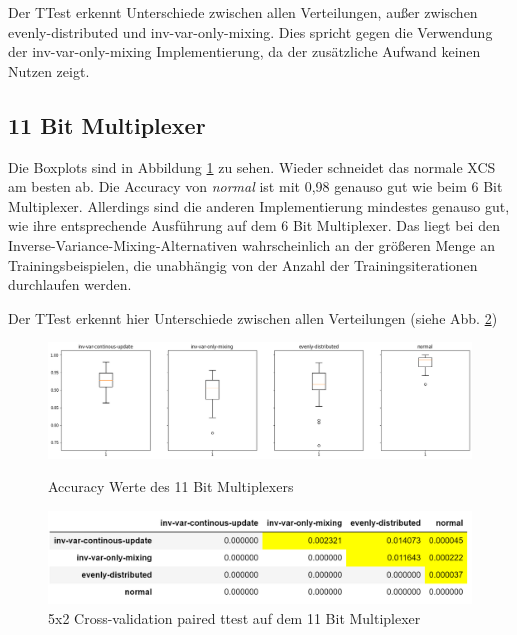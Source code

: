 \documentclass[10pt]{ocsmnar}
\begin{document}
Der TTest erkennt Unterschiede zwischen allen Verteilungen, außer zwischen evenly-distributed und inv-var-only-mixing. Dies spricht gegen die Verwendung der inv-var-only-mixing Implementierung, da der zusätzliche Aufwand keinen Nutzen zeigt.

\subsection{11 Bit Multiplexer}

Die Boxplots sind in Abbildung \ref{boxplot-11-bit} zu sehen. Wieder schneidet das normale XCS am besten ab. Die Accuracy von \textit{normal} ist mit 0,98 genauso gut wie beim 6 Bit Multiplexer. Allerdings sind die anderen Implementierung mindestes genauso gut, wie ihre entsprechende Ausführung auf dem 6 Bit Multiplexer.  Das liegt bei den Inverse-Variance-Mixing-Alternativen wahrscheinlich an der größeren Menge an Trainingsbeispielen, die unabhängig von der Anzahl der Trainingsiterationen durchlaufen werden. 

Der TTest erkennt hier Unterschiede zwischen allen Verteilungen (siehe Abb. \ref{ttest-11-bit})

\begin{figure}[h]
    \includegraphics[width=\linewidth]{img/boxplot_11_bit.png}
    \caption{Accuracy Werte des 11 Bit Multiplexers}\label{boxplot-11-bit}
    \label{boxplot-11-bit}
\end{figure}

\begin{figure}[h]
    \includegraphics[width=\linewidth]{img/ttest_11_bit.png}
    \caption{5x2 Cross-validation paired ttest auf dem 11 Bit Multiplexer}\label{ttest-11-bit}
\end{figure}
\end{document}

